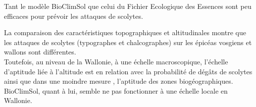Tant le modèle BioClimSol que celui du Fichier Ecologique des Essences sont peu efficaces pour prévoir les attaques de scolytes.

La comparaison des caractéristiques topographiques et altitudinales montre que les attaques de scolytes (typographes et chalcographes) sur les épicéas vosgiens et wallons sont différentes.\\

Toutefois, au niveau de la Wallonie, à une échelle macroscopique, l'échelle d'aptitude liée à l'altitude est en relation avec la probabilité de dégâts de scolytes ainsi que dans une moindre mesure , l'aptitude des zones biogéographiques.\\

BioClimSol, quant à lui, semble ne pas fonctionner à une échelle locale en Wallonie.




